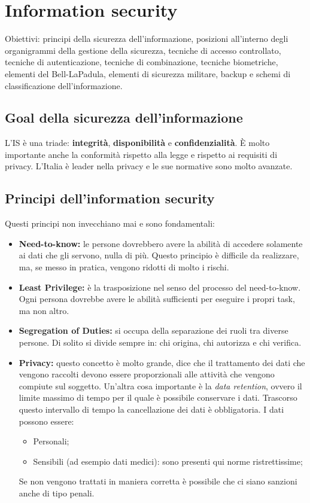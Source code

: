 \chapter{Information security}

Obiettivi: principi della sicurezza dell'informazione, posizioni all'interno 
degli organigrammi della gestione della sicurezza, tecniche di accesso 
controllato, tecniche di autenticazione, tecniche di combinazione, 
tecniche biometriche, elementi del Bell-LaPadula, elementi di sicurezza 
militare, backup e schemi di classificazione dell'informazione.


\section{Goal della sicurezza dell'informazione}

L'IS è una triade: \textbf{integrità}, \textbf{disponibilità} e 
\textbf{confidenzialità}. È molto importante anche la conformità rispetto alla 
legge e rispetto ai requisiti di privacy. L'Italia è leader nella privacy e le 
sue normative sono molto avanzate.


\section{Principi dell'information security}

Questi principi non invecchiano mai e sono fondamentali:
\begin{itemize}
  \item \textbf{Need-to-know:} le persone dovrebbero avere la abilità di 
  accedere solamente ai dati che gli servono, nulla di più. Questo principio è 
  difficile da realizzare, ma, se messo in pratica, vengono ridotti di molto i 
  rischi.
  \item \textbf{Least Privilege:} è la trasposizione nel senso del processo 
  del need-to-know. Ogni persona dovrebbe avere le abilità sufficienti per 
  eseguire i propri task, ma non altro.
  \item \textbf{Segregation of Duties:} si occupa della separazione dei ruoli 
  tra diverse persone. Di solito si divide sempre in: chi origina, chi 
  autorizza e chi verifica.
  \item \textbf{Privacy:} questo concetto è molto grande, dice che il 
  trattamento dei dati che vengono raccolti devono essere proporzionali alle 
  attività che vengono compiute sul soggetto. Un'altra cosa importante è la 
  \textit{data retention}, ovvero il limite massimo di tempo per il quale è 
  possibile conservare i dati. Trascorso questo intervallo di tempo la 
  cancellazione dei dati è obbligatoria. I dati possono essere:
  \begin{itemize}
    \item Personali;
    \item Sensibili (ad esempio dati medici): sono presenti qui norme
    ristrettissime;
  \end{itemize}
  Se non vengono trattati in maniera corretta è possibile che ci siano sanzioni
  anche di tipo penali.
\end{itemize}

